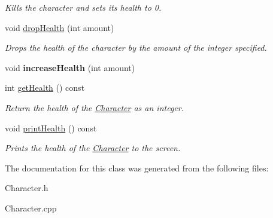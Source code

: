 \begin{DoxyCompactItemize}
\begin{DoxyCompactList}\small\item\em Kills the character and sets its health to 0. \item\end{DoxyCompactList}\item 
\hypertarget{classCharacter_a216657cde7bd88523bbeb3ae3abffd31}{
void \hyperlink{classCharacter_a216657cde7bd88523bbeb3ae3abffd31}{dropHealth} (int amount)}
\label{classCharacter_a216657cde7bd88523bbeb3ae3abffd31}

\begin{DoxyCompactList}\small\item\em Drops the health of the character by the amount of the integer specified. \item\end{DoxyCompactList}\item 
\hypertarget{classCharacter_a64fd5a2b59913c1b01dfaa43e3729987}{
void {\bfseries increaseHealth} (int amount)}
\label{classCharacter_a64fd5a2b59913c1b01dfaa43e3729987}

\item 
\hypertarget{classCharacter_af1e08fcaa1002081fc729dd3101db049}{
int \hyperlink{classCharacter_af1e08fcaa1002081fc729dd3101db049}{getHealth} () const }
\label{classCharacter_af1e08fcaa1002081fc729dd3101db049}

\begin{DoxyCompactList}\small\item\em Return the health of the \hyperlink{classCharacter}{Character} as an integer. \item\end{DoxyCompactList}\item 
\hypertarget{classCharacter_ad717effc421d6300edccdff2d3dec35a}{
void \hyperlink{classCharacter_ad717effc421d6300edccdff2d3dec35a}{printHealth} () const }
\label{classCharacter_ad717effc421d6300edccdff2d3dec35a}

\begin{DoxyCompactList}\small\item\em Prints the health of the \hyperlink{classCharacter}{Character} to the screen. \item\end{DoxyCompactList}\end{DoxyCompactItemize}


The documentation for this class was generated from the following files:\begin{DoxyCompactItemize}
\item 
Character.h\item 
Character.cpp\end{DoxyCompactItemize}
